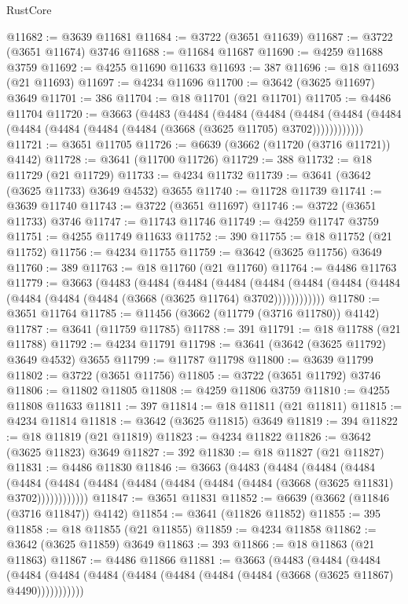 \begin{lexlean}{RustCore}
\begin{coremodule}
@11682 := @3639 @11681
@11684 := @3722 (@3651 @11639)
@11687 := @3722 (@3651 @11674) @3746
@11688 := @11684 @11687
@11690 := @4259 @11688 @3759
@11692 := @4255 @11690 @11633
@11693 := 387
@11696 := @18 @11693 (@21 @11693)
@11697 := @4234 @11696
@11700 := @3642 (@3625 @11697) @3649
@11701 := 386
@11704 := @18 @11701 (@21 @11701)
@11705 := @4486 @11704
@11720 := @3663
    (@4483
      (@4484
        (@4484
          (@4484
            (@4484 (@4484 (@4484 (@4484 (@4484 (@4484 (@4484 (@3668 (@3625 @11705) @3702))))))))))))
@11721 := @3651 @11705
@11726 := @6639 (@3662 (@11720 (@3716 @11721)) @4142)
@11728 := @3641 (@11700 @11726)
@11729 := 388
@11732 := @18 @11729 (@21 @11729)
@11733 := @4234 @11732
@11739 := @3641 (@3642 (@3625 @11733) @3649 @4532) @3655
@11740 := @11728 @11739
@11741 := @3639 @11740
@11743 := @3722 (@3651 @11697)
@11746 := @3722 (@3651 @11733) @3746
@11747 := @11743 @11746
@11749 := @4259 @11747 @3759
@11751 := @4255 @11749 @11633
@11752 := 390
@11755 := @18 @11752 (@21 @11752)
@11756 := @4234 @11755
@11759 := @3642 (@3625 @11756) @3649
@11760 := 389
@11763 := @18 @11760 (@21 @11760)
@11764 := @4486 @11763
@11779 := @3663
    (@4483
      (@4484
        (@4484
          (@4484
            (@4484 (@4484 (@4484 (@4484 (@4484 (@4484 (@4484 (@3668 (@3625 @11764) @3702))))))))))))
@11780 := @3651 @11764
@11785 := @11456 (@3662 (@11779 (@3716 @11780)) @4142)
@11787 := @3641 (@11759 @11785)
@11788 := 391
@11791 := @18 @11788 (@21 @11788)
@11792 := @4234 @11791
@11798 := @3641 (@3642 (@3625 @11792) @3649 @4532) @3655
@11799 := @11787 @11798
@11800 := @3639 @11799
@11802 := @3722 (@3651 @11756)
@11805 := @3722 (@3651 @11792) @3746
@11806 := @11802 @11805
@11808 := @4259 @11806 @3759
@11810 := @4255 @11808 @11633
@11811 := 397
@11814 := @18 @11811 (@21 @11811)
@11815 := @4234 @11814
@11818 := @3642 (@3625 @11815) @3649
@11819 := 394
@11822 := @18 @11819 (@21 @11819)
@11823 := @4234 @11822
@11826 := @3642 (@3625 @11823) @3649
@11827 := 392
@11830 := @18 @11827 (@21 @11827)
@11831 := @4486 @11830
@11846 := @3663
    (@4483
      (@4484
        (@4484
          (@4484
            (@4484 (@4484 (@4484 (@4484 (@4484 (@4484 (@4484 (@3668 (@3625 @11831) @3702))))))))))))
@11847 := @3651 @11831
@11852 := @6639 (@3662 (@11846 (@3716 @11847)) @4142)
@11854 := @3641 (@11826 @11852)
@11855 := 395
@11858 := @18 @11855 (@21 @11855)
@11859 := @4234 @11858
@11862 := @3642 (@3625 @11859) @3649
@11863 := 393
@11866 := @18 @11863 (@21 @11863)
@11867 := @4486 @11866
@11881 := @3663
    (@4483
      (@4484
        (@4484
          (@4484 (@4484 (@4484 (@4484 (@4484 (@4484 (@4484 (@3668 (@3625 @11867) @4490)))))))))))

\end{coremodule}
\end{lexlean}
